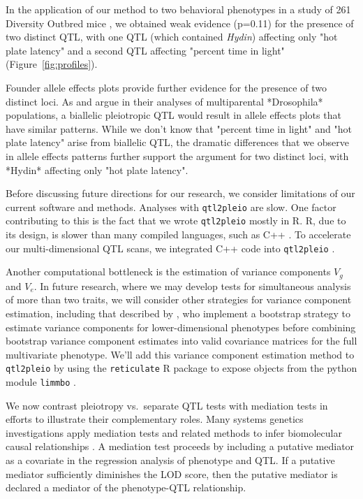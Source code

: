 \documentclass[12pt,twoside, lineno]{gsajnl}
\begin{document}
In the application of our method to two behavioral phenotypes in a
study of 261 Diversity Outbred mice
\citep{recla2014precise,logan2013high}, we obtained weak evidence
(p=0.11) for the presence of two distinct QTL, with one QTL (which
contained \textit{Hydin}) affecting only "hot plate latency" and a
second QTL affecting "percent time in light" (Figure~\ref{fig:profiles}).

Founder allele effects plots provide further evidence for the presence
of two distinct loci. As \citet{macdonald2007joint} and
\citet{king2012genetic} argue in their analyses of multiparental
*Drosophila* populations, a biallelic pleiotropic QTL would result in
allele effects plots that have similar patterns. While we don't know
that "percent time in light" and "hot plate latency" arise from
biallelic QTL, the dramatic differences that we observe in allele
effects patterns further support the argument for two distinct loci,
with *Hydin* affecting only "hot plate latency".

Before discussing future directions for our research, we consider
limitations of our current software and methods. Analyses with
\texttt{qtl2pleio} are slow. One factor contributing to this is the
fact that we wrote \texttt{qtl2pleio} mostly in R. R, due to its
design, is slower than many compiled languages, such as C++
\citep{wickham2014advanced}. To accelerate our multi-dimensional QTL
scans, we integrated C++ code into \texttt{qtl2pleio}
\citep{eddelbuettel2011rcpp}.

Another computational bottleneck is the estimation of variance
components $V_g$ and $V_e$. In future research, where we may develop
tests for simultaneous analysis of more than two traits, we will
consider other strategies for variance component estimation, including
that described by \citet{hannah2018limmbo}, who implement a bootstrap
strategy to estimate variance components for lower-dimensional
phenotypes before combining bootstrap variance component estimates
into valid covariance matrices for the full multivariate phenotype.
We'll add this variance component estimation method to
\texttt{qtl2pleio} by using the \texttt{reticulate} R package to
expose objects from the python module \texttt{limmbo}
\citep{reticulate}.


We now contrast pleiotropy vs.\ separate QTL tests with mediation tests
in efforts to illustrate their complementary roles. Many systems
genetics investigations apply mediation tests and related methods to
infer biomolecular causal relationships
\citep{chick2016defining,schadt2005integrative,baron1986moderator}. A
mediation test proceeds by including a putative mediator as a
covariate in the regression analysis of phenotype and QTL. If a
putative mediator sufficiently diminishes the LOD score, then the
putative mediator is declared a mediator of the phenotype-QTL
relationship.
\end{document}
